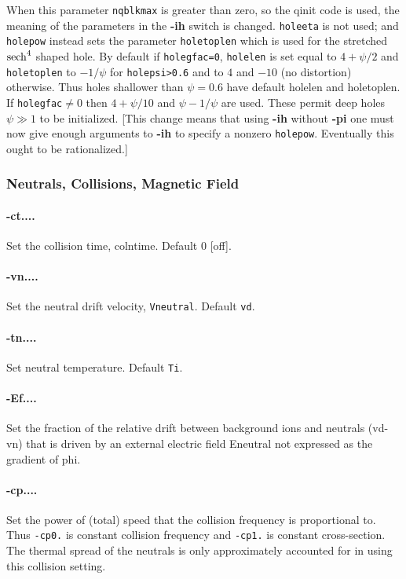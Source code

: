 \documentclass[12pt]{article}
\begin{document}
When this parameter \verb!nqblkmax! is greater than zero, so the qinit
code is used, the meaning of the parameters in the \textbf{-ih} switch
is changed. \verb!holeeta! is not used; and \verb!holepow! instead
sets the parameter \verb!holetoplen!  which is used for the stretched
${\rm sech}^4$ shaped hole. By default if \verb!holegfac=0!,
\verb!holelen! is set equal to $4+\psi/2$ and \verb!holetoplen! to
$-1/\psi$ for \verb!holepsi>0.6! and to $4$ and $-10$ (no distortion)
otherwise. Thus holes shallower than $\psi=0.6$ have default holelen
and holetoplen. If \verb!holegfac!$\not=0$ then $4+\psi/10$ and
$\psi-1/\psi$ are used. These permit deep holes $\psi\gg1$ to be
initialized.  [This change means that using {\bf -ih} without {\bf
  -pi} one must now give enough arguments to {\bf -ih} to specify a
nonzero \verb!holepow!. Eventually this ought to be rationalized.]


\subsubsection*{Neutrals, Collisions, Magnetic Field}

\paragraph{-ct....} Set the collision time, colntime. Default 0 [off].

\paragraph{-vn....} Set the neutral drift velocity, \verb!Vneutral!. Default \verb!vd!.

\paragraph{-tn....} Set neutral temperature. Default \verb!Ti!. 

\paragraph{-Ef....} Set the fraction of the relative drift between
background ions and neutrals (vd-vn) that is driven by an external
electric field Eneutral not expressed as the gradient of phi.

\paragraph{-cp....} Set the power of (total) speed that the
collision frequency is proportional to. Thus \verb!-cp0.! is constant
collision frequency and \verb!-cp1.! is constant cross-section. The
thermal spread of the neutrals is only approximately accounted for in
using this collision setting.
\end{document}
